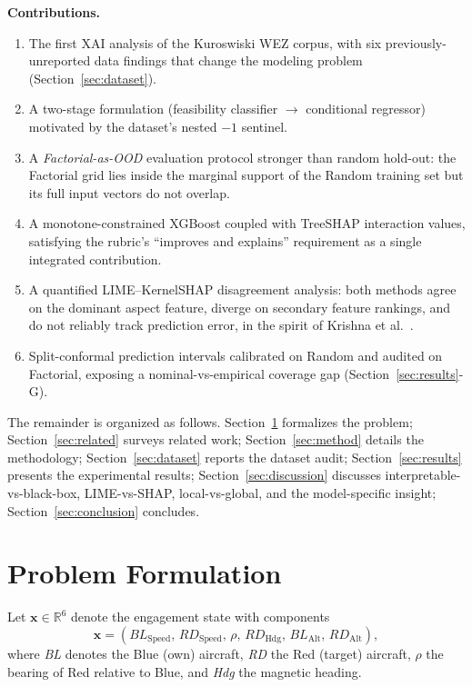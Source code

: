 \documentclass[conference]{IEEEtran}
\begin{document}
\textbf{Contributions.}
\begin{enumerate}
    \item The first XAI analysis of the Kuroswiski WEZ corpus, with six previously-unreported data findings that change the modeling problem (Section~\ref{sec:dataset}).
    \item A two-stage formulation (feasibility classifier $\to$ conditional regressor) motivated by the dataset's nested $-1$ sentinel.
    \item A \textit{Factorial-as-OOD} evaluation protocol stronger than random hold-out: the Factorial grid lies inside the marginal support of the Random training set but its full input vectors do not overlap.
    \item A monotone-constrained XGBoost coupled with TreeSHAP interaction values, satisfying the rubric's ``improves and explains'' requirement as a single integrated contribution.
    \item A quantified LIME--KernelSHAP disagreement analysis: both methods agree on the dominant aspect feature, diverge on secondary feature rankings, and do not reliably track prediction error, in the spirit of Krishna et al.~\cite{krishna2022}.
    \item Split-conformal prediction intervals calibrated on Random and audited on Factorial, exposing a nominal-vs-empirical coverage gap (Section~\ref{sec:results}-G).
\end{enumerate}

The remainder is organized as follows. Section~\ref{sec:problem} formalizes the problem; Section~\ref{sec:related} surveys related work; Section~\ref{sec:method} details the methodology; Section~\ref{sec:dataset} reports the dataset audit; Section~\ref{sec:results} presents the experimental results; Section~\ref{sec:discussion} discusses interpretable-vs-black-box, LIME-vs-SHAP, local-vs-global, and the model-specific insight; Section~\ref{sec:conclusion} concludes.

\section{Problem Formulation}
\label{sec:problem}
Let $\mathbf{x} \in \mathbb{R}^6$ denote the engagement state with components
\begin{equation*}
    \mathbf{x} = (BL_{\text{Speed}},\, RD_{\text{Speed}},\, \rho,\, RD_{\text{Hdg}},\, BL_{\text{Alt}},\, RD_{\text{Alt}}),
\end{equation*}
where \textit{BL} denotes the Blue (own) aircraft, \textit{RD} the Red (target) aircraft, $\rho$ the bearing of Red relative to Blue, and \textit{Hdg} the magnetic heading.
\end{document}
